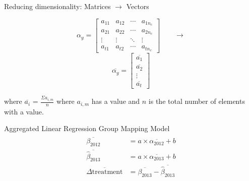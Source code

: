 \documentclass{beamer}
\begin{document}

\begin{frame}{Reducing dimensionality: Matrices $\rightarrow$ Vectors}
  \begin{multicols}{2}
    $$
    \alpha_y = \left[\begin{array}{cccc}
    a_{11} & a_{12} & \cdots & a_{1 n_c} \\
    a_{21} & a_{22} & \cdots & a_{2 n_c} \\
    \vdots & \vdots & \ddots & \vdots \\
    a_{t 1} & a_{t 2} & \cdots & a_{t n_c}
    \end{array}\right]
    \qquad\longrightarrow
    $$
    \break
    $$
    \overline{\alpha_y} = \left[\begin{array}{cccc}
    \overline{a_{1}} \\
    \overline{a_{2}} \\
    \vdots \\
    \overline{a_{t}}
    \end{array}\right]
    $$
  \end{multicols}
  where $\overline{a_{i}}$ = $\frac{\Sigma{a_{i, m}}}{n}$ where $a_{i, m}$ has a value and $n$ is the total number of elements with a value.
\end{frame}

\begin{frame}{Aggregated Linear Regression Group Mapping Model}
  \begin{align*}
    \begin{split}
      \overline{\beta_{2012}} &= a \times \overline{\alpha_{2012}} + b \\
      \overline{\hat{\beta}_{2013}} &= a \times \overline{\alpha_{2013}} + b \\
      \overline{\Delta\mbox{treatment}} &= \overline{\beta_{2013}} - \overline{\hat{\beta}_{2013}}
    \end{split}
  \end{align*}
\end{frame}
\end{document}
